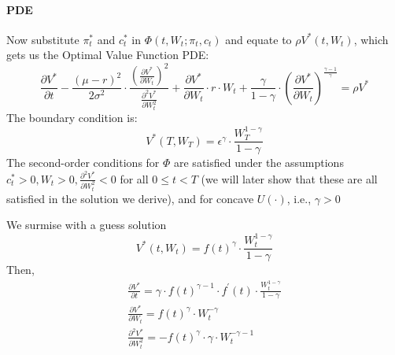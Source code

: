 \documentclass[11pt]{article}
\begin{document}
\paragraph*{PDE}
Now substitute $\pi_t^*$ and $c_t^*$ in $\Phi\left(t, W_t ; \pi_t, c_t\right)$ and equate to $\rho V^*\left(t, W_t\right)$, which gets us the Optimal Value Function PDE:
$$
\frac{\partial V^*}{\partial t}-\frac{(\mu-r)^2}{2 \sigma^2} \cdot \frac{\left(\frac{\partial V^*}{\partial W_t}\right)^2}{\frac{\partial^2 V^*}{\partial W_t^2}}+\frac{\partial V^*}{\partial W_t} \cdot r \cdot W_t+\frac{\gamma}{1-\gamma} \cdot\left(\frac{\partial V^*}{\partial W_t}\right)^{\frac{\gamma-1}{\gamma}}=\rho V^*
$$
The boundary condition is:
$$
V^*\left(T, W_T\right)=\epsilon^\gamma \cdot \frac{W_T^{1-\gamma}}{1-\gamma}
$$
The second-order conditions for $\Phi$ are satisfied under the assumptions $c_t^*>0, W_t>0, \frac{\partial^2 V^*}{\partial W_t^2}<0$ for all $0 \leq t<T$ (we will later show that these are all satisfied in the solution we derive), and for concave $U(\cdot)$, i.e., $\gamma>0$

We surmise with a guess solution
$$
V^*\left(t, W_t\right)=f(t)^\gamma \cdot \frac{W_t^{1-\gamma}}{1-\gamma}
$$
Then,
$$
\begin{gathered}
\frac{\partial V^*}{\partial t}=\gamma \cdot f(t)^{\gamma-1} \cdot f^{\prime}(t) \cdot \frac{W_t^{1-\gamma}}{1-\gamma} \\
\frac{\partial V^*}{\partial W_t}=f(t)^\gamma \cdot W_t^{-\gamma} \\
\frac{\partial^2 V^*}{\partial W_t^2}=-f(t)^\gamma \cdot \gamma \cdot W_t^{-\gamma-1}
\end{gathered}
$$
\end{document}
